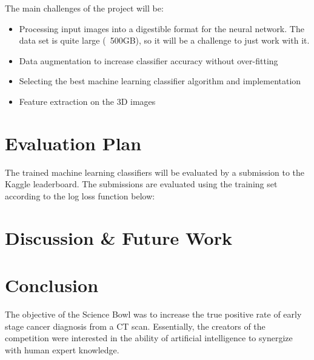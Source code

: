 \documentclass[conference,11pt]{IEEEtran}
\begin{document}
The main challenges of the project will be:
\begin{itemize}
  \item Processing input images into a digestible format for the neural network. The data set is quite large (~500GB), so it will be a challenge to just work with it.
  \item Data augmentation to increase classifier accuracy without over-fitting
  \item Selecting the best machine learning classifier algorithm and implementation
  \item Feature extraction on the 3D images
\end{itemize}

\section{Evaluation Plan}
The trained machine learning classifiers will be evaluated by a submission to the Kaggle leaderboard. The submissions are evaluated using the training set according to the log loss function below:

\section{Discussion & Future Work}

\section{Conclusion}

The objective of the Science Bowl was to increase the true positive rate of early stage cancer diagnosis from a CT scan. Essentially, the creators of the competition were interested in the ability of artificial intelligence to synergize with human expert knowledge.

\begin{figure}
    \centering
    	\hspace{0.02\linewidth}
      \label{fig:hist}
\end{figure}
\end{document}
